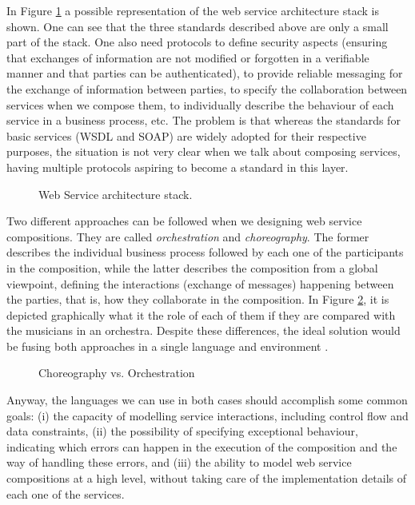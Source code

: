 In Figure \ref{Figure1} a possible representation of the web service architecture stack is shown. 
One can see that the three standards described above are only a small part of the stack. 
One also need protocols to define security aspects (ensuring that exchanges of information 
are not modified or forgotten in a verifiable manner and that parties can be authenticated), 
to provide reliable messaging for the exchange of information between parties, 
to specify the collaboration between services when we compose them, 
to individually describe the behaviour of each service in a business process, etc. 
The problem is that whereas the standards for basic services (WSDL and SOAP) 
are widely adopted for their respective purposes, the situation is not very 
clear when we talk about composing services, 
having multiple protocols aspiring to become a standard in this layer.

\begin{figure}[h]
\begin{center}
\end{center}
\caption{Web Service architecture stack.}
\label{Figure1}
\end{figure}

Two different approaches can be followed when we designing web service compositions. 
They are called \textit{orchestration} and \textit{choreography}. 
The former describes the individual business process followed by 
each one of the participants in the composition, 
while the latter describes the composition from a global viewpoint, 
defining the interactions (exchange of messages) happening between the parties, that is, 
how they collaborate in the composition. In Figure \ref{orch}, it is depicted graphically what it the role
of each of them if they are compared with the musicians in an orchestra. Despite these differences, the ideal solution would 
be fusing both approaches in a single language and environment \cite{Papazoglou2007}.

\begin{figure}[h]
\begin{center}
\end{center}
\caption{Choreography vs. Orchestration}
\label{orch}
\end{figure}

Anyway, the languages we can use in both cases should accomplish some common goals: 
(i) the capacity of modelling service interactions, including control flow and data constraints, 
(ii) the possibility of specifying exceptional behaviour, 
indicating which errors can happen in the execution of the composition 
and the way of handling these errors, and (iii) the ability to model web service compositions at a high level, 
without taking care of the implementation details of each one of the services.

